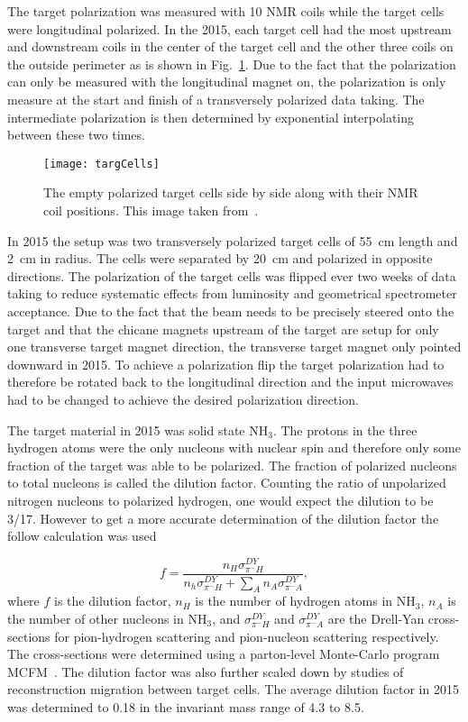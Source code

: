 The target polarization was measured with 10 NMR coils while the target cells
were longitudinal polarized.  In the 2015, each target cell had the most
upstream and downstream coils in the center of the target cell and the other
three coils on the outside perimeter as is shown in Fig.~\ref{fig::targCells}.
Due to the fact that the polarization can only be measured with the longitudinal
magnet on, the polarization is only measure at the start and finish of a
transversely polarized data taking.  The intermediate polarization is then
determined by exponential interpolating between these two times.

\begin{figure}[h!t]
  \centering
  \texttt{[image: targCells]}
  \caption{The empty polarized target cells side by side along with their NMR
    coil positions.  This image taken from~\cite{polTargCells}.}
  \label{fig::targCells}
\end{figure}

In 2015 the setup was two transversely polarized target cells of 55~cm length
and 2~cm in radius.  The cells were separated by 20~cm and polarized in opposite
directions.  The polarization of the target cells was flipped ever two weeks of
data taking to reduce systematic effects from luminosity and geometrical
spectrometer acceptance.  Due to the fact that the beam needs to be precisely
steered onto the target and that the chicane magnets upstream of the target are
setup for only one transverse target magnet direction, the transverse target
magnet only pointed downward in 2015.  To achieve a polarization flip the target
polarization had to therefore be rotated back to the longitudinal direction and
the input microwaves had to be changed to achieve the desired polarization
direction. \par

The target material in 2015 was solid state NH$_3$.  The protons in the three
hydrogen atoms were the only nucleons with nuclear spin and therefore only some
fraction of the target was able to be polarized.  The fraction of polarized
nucleons to total nucleons is called the dilution factor.  Counting the ratio of
unpolarized nitrogen nucleons to polarized hydrogen, one would expect the
dilution to be 3/17.  However to get a more accurate determination of the
dilution factor the follow calculation was used

\begin{equation}
  f = \frac{n_H\sigma^{DY}_{\pi^-H}}
  {n_h\sigma^{DY}_{\pi^-H} + \sum_A n_A\sigma^{DY}_{\pi^-A}},
  \label{equ::dilution}
\end{equation}
where $f$ is the dilution factor, $n_H$ is the number of hydrogen atoms in
NH$_3$, $n_A$ is the number of other nucleons in NH$_3$, and
$\sigma^{DY}_{\pi^-H}$ and $\sigma^{DY}_{\pi^-A}$ are the Drell-Yan
cross-sections for pion-hydrogen scattering and pion-nucleon scattering
respectively.  The cross-sections were determined using a parton-level
Monte-Carlo program MCFM~\cite{MCFM}.  The dilution factor was also further
scaled down by studies of reconstruction migration between target cells.  The
average dilution factor in 2015 was determined to 0.18 in the invariant mass
range of 4.3{\gvcs} to 8.5{\gvcs}.


